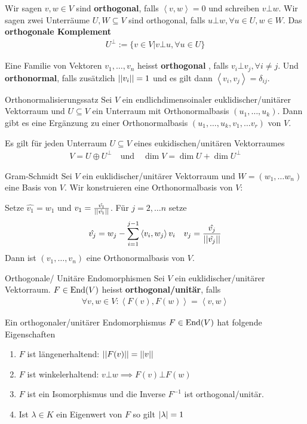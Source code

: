 Wir sagen $v,w \in V$ sind \textbf{orthogonal}, falls $\left<v,w\right> = 0$ und schreiben $v \bot w$. Wir sagen zwei Unterräume $U,W \subseteq V$ sind orthogonal, falls $u \bot w, \forall u \in U, w \in W$. Das \textbf{orthogonale Komplement}
\begin{align*}
    U^{\bot} := \{v \in V \big\vert v \bot u, \forall u \in U\}
\end{align*}

Eine Familie von Vektoren $v_{1}, \ldots, v_{n}$ heisst \textbf{orthogonal }, falls $v_i \bot v_j, \forall i\neq j$. Und \textbf{orthonormal}, falls zusätzlich $\vert\vert v_i\vert\vert = 1$ und es gilt dann $\left<v_i,v_j\right> = \delta_{ij}$.

\begin{satz}{Orthonormalisierungssatz}
    Sei $V$ ein endlichdimensoinaler euklidischer/unitärer Vektorraum und $U \subseteq V$ ein Unterraum mit Orthonormalbasis $(u_{1}, \ldots, u_{k})$. Dann gibt es eine Ergänzung zu einer Orthonormalbasis $(u_{1}, \ldots, u_{k}, v_1, \ldots v_r)$ von $V$. 
\end{satz}
Es gilt für jeden Unterraum $U \subseteq V$ eines eukidischen/unitären Vektorraumes
\begin{align*}
    V = U \oplus U^{\bot} \quad \text{und} \quad \dim V = \dim U + \dim U^{\bot}
\end{align*}

\begin{algorithmus}{Gram-Schmidt}
    Sei $V$ ein euklidischer/unitärer Vektorraum und $W = (w_1, \ldots w_n)$ eine Basis von $V$. Wir konstruieren eine Orthonormalbasis von $V$:
    
    Setze $\hat{v_1} = w_1$ und $v_1 = \frac{\hat{v_1}}{\vert\vert\hat{v_1}\vert\vert}$. Für $j = 2, \ldots n$ setze
    \begin{align*}
        \hat{v_j} = w_j - \sum_{i = 1}^{j-1} \left<v_i,w_j\right>v_i \quad v_j = \frac{\hat{v_j}}{\vert\vert\hat{v_j}\vert\vert}
    \end{align*}
    Dann ist $(v_{1}, \ldots, v_{n})$ eine Orthonormalbasis von $V$.
\end{algorithmus}


\begin{definition}{Orthogonale/ Unitäre Endomorphismen}
    Sei $V$ ein euklidischer/unitärer Vektorraum. $F \in \operatorname{End}(V)$ heisst \textbf{orthogonal/unitär}, falls 
    \begin{align*}
        \forall v,w \in V: \left<F(v),F(w)\right> = \left<v,w\right>
    \end{align*}
\end{definition}
Ein orthogonaler/unitärer Endomorphismus $F \in \operatorname{End}(V)$ hat folgende Eigenschaften
\begin{enumerate}
    \item	$F$ ist längenerhaltend: $\vert\vert F(v)\vert\vert = \vert\vert v\vert\vert$
    \item   $F$ ist winkelerhaltend: $v \bot w \implies F(v) \bot F(w)$
    \item   $F$ ist ein Isomorphismus und die Inverse $F^{-1}$ ist orthogonal/unitär. 
    \item   Ist $\lambda \in K$ ein Eigenwert von $F$ so gilt $\vert\lambda\vert = 1$
\end{enumerate}

